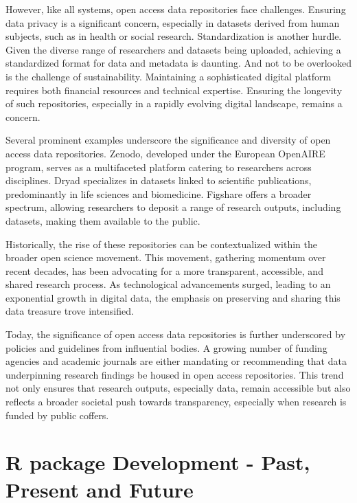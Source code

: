\documentclass[print]{nuthesis}
\begin{document}
However, like all systems, open access data repositories face challenges.
Ensuring data privacy is a significant concern, especially in datasets derived from human subjects, such as in health or social research.
Standardization is another hurdle.
Given the diverse range of researchers and datasets being uploaded, achieving a standardized format for data and metadata is daunting.
And not to be overlooked is the challenge of sustainability.
Maintaining a sophisticated digital platform requires both financial resources and technical expertise.
Ensuring the longevity of such repositories, especially in a rapidly evolving digital landscape, remains a concern.

Several prominent examples underscore the significance and diversity of open access data repositories.
Zenodo, developed under the European OpenAIRE program, serves as a multifaceted platform catering to researchers across disciplines.
Dryad specializes in datasets linked to scientific publications, predominantly in life sciences and biomedicine.
Figshare offers a broader spectrum, allowing researchers to deposit a range of research outputs, including datasets, making them available to the public.

Historically, the rise of these repositories can be contextualized within the broader open science movement.
This movement, gathering momentum over recent decades, has been advocating for a more transparent, accessible, and shared research process.
As technological advancements surged, leading to an exponential growth in digital data, the emphasis on preserving and sharing this data treasure trove intensified.

Today, the significance of open access data repositories is further underscored by policies and guidelines from influential bodies.
A growing number of funding agencies and academic journals are either mandating or recommending that data underpinning research findings be housed in open access repositories.
This trend not only ensures that research outputs, especially data, remain accessible but also reflects a broader societal push towards transparency, especially when research is funded by public coffers.

\hypertarget{r-package-development---past-present-and-future}{%
\section{R package Development - Past, Present and Future}\label{r-package-development---past-present-and-future}}
\end{document}
